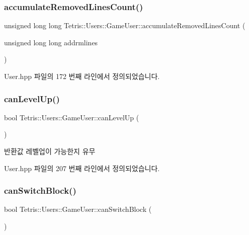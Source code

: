 \subsubsection{\texorpdfstring{accumulate\+Removed\+Lines\+Count()}{accumulateRemovedLinesCount()}}
{\footnotesize\ttfamily unsigned long long Tetris\+::\+Users\+::\+Game\+User\+::accumulate\+Removed\+Lines\+Count (\begin{DoxyParamCaption}\item[{unsigned long long}]{addrmlines }\end{DoxyParamCaption})\hspace{0.3cm}{\ttfamily [inline]}}



User.\+hpp 파일의 172 번째 라인에서 정의되었습니다.

\mbox{\label{class_tetris_1_1_users_1_1_game_user_a93e385fd100ac5ec2f6f6b9f0fab2950}} 
\subsubsection{\texorpdfstring{can\+Level\+Up()}{canLevelUp()}}
{\footnotesize\ttfamily bool Tetris\+::\+Users\+::\+Game\+User\+::can\+Level\+Up (\begin{DoxyParamCaption}{ }\end{DoxyParamCaption})\hspace{0.3cm}{\ttfamily [inline]}}

\begin{DoxyReturn}{반환값}
레벨업이 가능한지 유무 
\end{DoxyReturn}


User.\+hpp 파일의 207 번째 라인에서 정의되었습니다.

\mbox{\label{class_tetris_1_1_users_1_1_game_user_a8a777ef1ffbbc53ebae4172830863eb4}} 
\subsubsection{\texorpdfstring{can\+Switch\+Block()}{canSwitchBlock()}\hspace{0.1cm}{\footnotesize\ttfamily [1/2]}}
{\footnotesize\ttfamily bool Tetris\+::\+Users\+::\+Game\+User\+::can\+Switch\+Block (\begin{DoxyParamCaption}{ }\end{DoxyParamCaption})}



